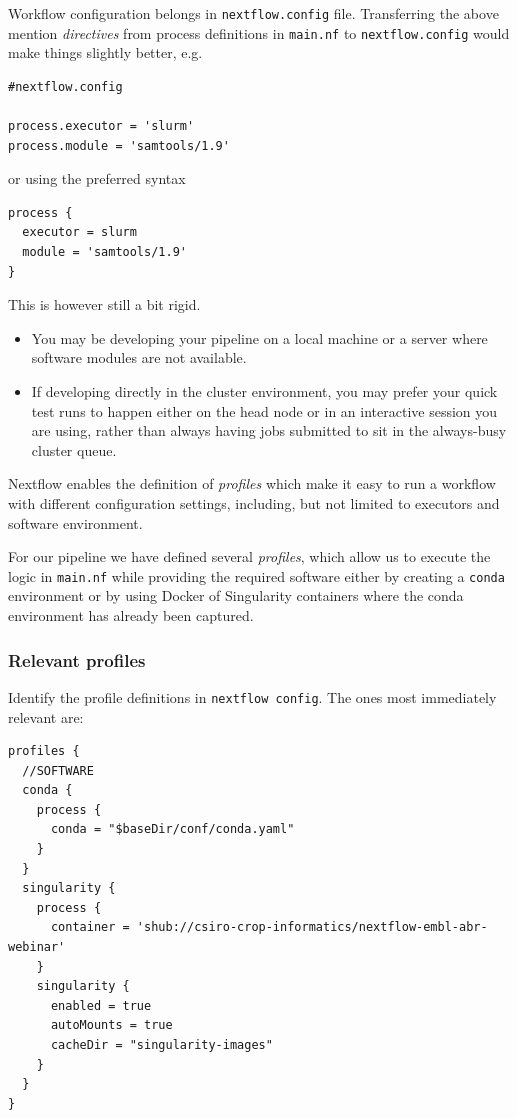 Workflow configuration belongs in \texttt{nextflow.config} file. 
Transferring the above mention \emph{directives} from process definitions in \texttt{main.nf} 
to \texttt{nextflow.config} would make things slightly better, e.g.

\begin{lstlisting}
#nextflow.config

process.executor = 'slurm' 
process.module = 'samtools/1.9' 
\end{lstlisting}

or using the preferred syntax

\begin{lstlisting}
process {
  executor = slurm
  module = 'samtools/1.9'
}
\end{lstlisting}


This is however still a bit rigid. 
\begin{itemize}
\item You may be developing your pipeline on a local machine or a server where software modules are not available. 
\item If developing directly in the cluster environment, you may prefer your quick test runs to happen either on the head node or in an interactive session you are using, rather than always having jobs submitted to sit in the always-busy cluster queue.
\end{itemize}



Nextflow enables the definition of \emph{profiles} which make it easy to run a workflow 
with different configuration settings, including, but not limited to executors and software environment.

For our pipeline we have defined several \emph{profiles}, which allow us to execute the logic in \texttt{main.nf} while providing the required software either by creating a \texttt{conda} environment or by using Docker of Singularity containers where the conda environment has already been captured. 

\subsubsection{Relevant profiles}


Identify the profile definitions in \texttt{nextflow config}. The ones most immediately relevant are:
\begin{lstlisting}
profiles {
  //SOFTWARE
  conda {
    process {
      conda = "$baseDir/conf/conda.yaml"
    }
  }
  singularity {
    process {
      container = 'shub://csiro-crop-informatics/nextflow-embl-abr-webinar' 
    }
    singularity {
      enabled = true
      autoMounts = true
      cacheDir = "singularity-images"  
    }
  }
}
\end{lstlisting}



